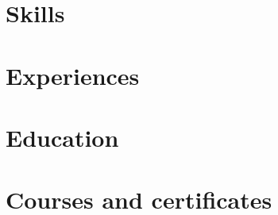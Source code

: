 \documentclass[letter,11pt]{article}
\begin{document}
\begin{justify}

\end{justify}

\section{Skills}


\section{Experiences}


\section{Education}


\section{Courses and certificates}

\end{document}
